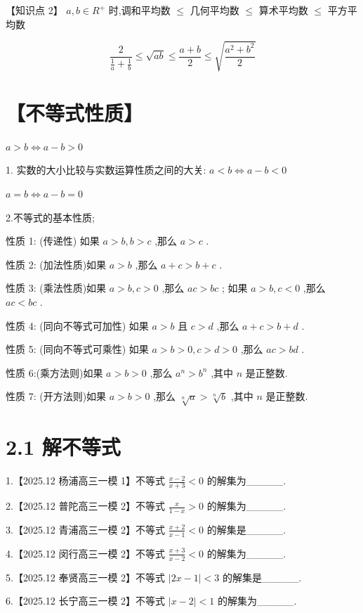 \documentclass[10pt]{article}
\begin{document}
【知识点 2】 \(a,b \in  {R}^{ + }\) 时,调和平均数 \(\leq\) 几何平均数 \(\leq\) 算术平均数 \(\leq\) 平方平均数

\[
\frac{2}{\frac{1}{a} + \frac{1}{b}} \leq  \sqrt{ab} \leq  \frac{a + b}{2} \leq  \sqrt{\frac{{a}^{2} + {b}^{2}}{2}}
\]

\section*{【不等式性质】}

\(a > b \Leftrightarrow  a - b > 0\)

1. 实数的大小比较与实数运算性质之间的大关: \(a < b \Leftrightarrow  a - b < 0\)

\(a = b \Leftrightarrow  a - b = 0\)

2.不等式的基本性质;

性质 1: (传递性) 如果 \(a > b,b > c\) ,那么 \(a > c\) .

性质 2: (加法性质)如果 \(a > b\) ,那么 \(a + c > b + c\) .

性质 3: (乘法性质)如果 \(a > b,c > 0\) ,那么 \({ac} > {bc}\) ; 如果 \(a > b,c < 0\) ,那么 \({ac} < {bc}\) .

性质 4: (同向不等式可加性) 如果 \(a > b\) 且 \(c > d\) ,那么 \(a + c > b + d\) .

性质 5: (同向不等式可乘性) 如果 \(a > b > 0,c > d > 0\) ,那么 \({ac} > {bd}\) .

性质 6:(乘方法则)如果 \(a > b > 0\) ,那么 \({a}^{n} > {b}^{n}\) ,其中 \(n\) 是正整数.

性质 7: (开方法则)如果 \(a > b > 0\) ,那么 \(\sqrt[n]{a} > \sqrt[n]{b}\) ,其中 \(n\) 是正整数.

\section*{2.1 解不等式}

1.【2025.12 杨浦高三一模 1】不等式 \(\frac{x - 2}{x + 3} < 0\) 的解集为\_\_\_\_\_.

2.【2025.12 普陀高三一模 2】不等式 \(\frac{x}{1 - x} > 0\) 的解集为\_\_\_\_\_.

3.【2025.12 青浦高三一模 2】不等式 \(\frac{x + 2}{x - 1} < 0\) 的解集是\_\_\_\_\_.

4.【2025.12 闵行高三一模 2】不等式 \(\frac{x + 3}{x - 2} < 0\) 的解集为\_\_\_\_\_.

5.【2025.12 奉贤高三一模 2】不等式 \(\left| {{2x} - 1}\right|  < 3\) 的解集是\_\_\_\_\_.

6.【2025.12 长宁高三一模 2】不等式 \(\left| {x - 2}\right|  < 1\) 的解集为\_\_\_\_\_.
\end{document}
